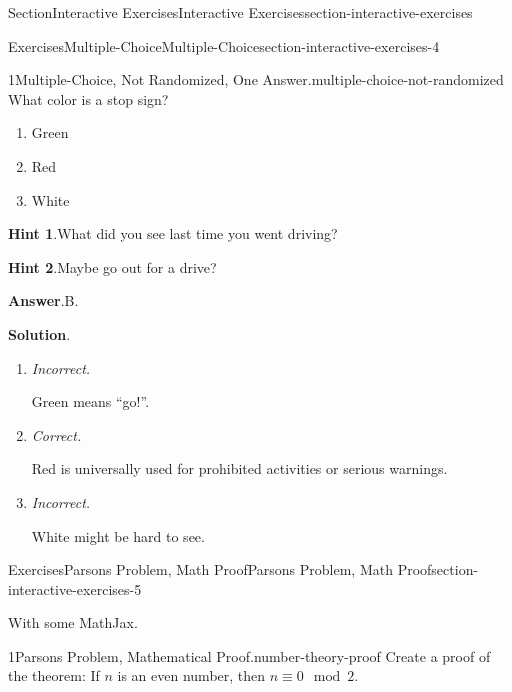 \documentclass[twoside,10pt,]{article}
\newcommand{\blocktitlefont}{\relax}
\newcommand{\lititle}[1]{{\slshape#1}}
\numberwithin{equation}{section}
\begin{document}
\begin{sectionptx}{Section}{Interactive Exercises}{}{Interactive Exercises}{}{}{section-interactive-exercises}
\begin{exercises-subsection}{Exercises}{Multiple-Choice}{}{Multiple-Choice}{}{}{section-interactive-exercises-4}
\begin{divisionexercise}{1}{Multiple-Choice, Not Randomized, One Answer.}{}{multiple-choice-not-randomized}
%
What color is a stop sign?%
\par
%
\begin{enumerate}[label={\Alph*.}]
\item{}Green%
\item{}Red%
\item{}White%
\end{enumerate}
%
\par\smallskip%
\noindent\textbf{\blocktitlefont Hint 1}.\hypertarget{multiple-choice-not-randomized-4}{}\quad{}What did you see last time you went driving?%
\par\smallskip%
\noindent\textbf{\blocktitlefont Hint 2}.\hypertarget{multiple-choice-not-randomized-5}{}\quad{}Maybe go out for a drive?%
\par\smallskip%
\noindent\textbf{\blocktitlefont Answer}.\hypertarget{multiple-choice-not-randomized-6}{}\quad{}B.%
\par\smallskip%
\noindent\textbf{\blocktitlefont Solution}.\hypertarget{multiple-choice-not-randomized-7}{}\quad{}%
\begin{enumerate}[label={\Alph*.}]
\item{}\lititle{Incorrect.}\par%
Green means ``go!''.%
\item{}\lititle{Correct.}\par%
Red is universally used for prohibited activities or serious warnings.%
\item{}\lititle{Incorrect.}\par%
White might be hard to see.%
\end{enumerate}
%
\end{divisionexercise}%
\end{exercises-subsection}
%
%
\typeout{************************************************}
\typeout{************************************************}
%
\begin{exercises-subsection}{Exercises}{Parsons Problem, Math Proof}{}{Parsons Problem, Math Proof}{}{}{section-interactive-exercises-5}
\begin{introduction}{}%
With some MathJax.%
\end{introduction}%
\begin{divisionexercise}{1}{Parsons Problem, Mathematical Proof.}{}{number-theory-proof}%
%
Create a proof of the theorem: If \(n\) is an even number, then \(n\equiv 0\mod 2\).%
\par
%
\begin{itemize}[label=\textbullet]

\end{itemize}
\end{divisionexercise}
\end{exercises-subsection}
\end{sectionptx}
\end{document}
